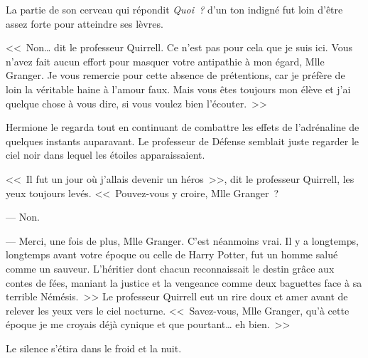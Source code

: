 La partie de son cerveau qui répondit \emph{Quoi~?} d'un ton indigné fut loin d'être assez forte pour atteindre ses lèvres.

<<~Non… dit le professeur Quirrell. Ce n'est pas pour cela que je suis ici. Vous n'avez fait aucun effort pour masquer votre antipathie à mon égard, Mlle Granger. Je vous remercie pour cette absence de prétentions, car je préfère de loin la véritable haine à l'amour faux. Mais vous êtes toujours mon élève et j'ai quelque chose à vous dire, si vous voulez bien l'écouter.~>>

Hermione le regarda tout en continuant de combattre les effets de l'adrénaline de quelques instants auparavant. Le professeur de Défense semblait juste regarder le ciel noir dans lequel les étoiles apparaissaient.

<<~Il fut un jour où j'allais devenir un héros~>>, dit le professeur Quirrell, les yeux toujours levés. <<~Pouvez-vous y croire, Mlle Granger~?

--- Non.

--- Merci, une fois de plus, Mlle Granger. C'est néanmoins vrai. Il y a longtemps, longtemps avant votre époque ou celle de Harry Potter, fut un homme salué comme un sauveur. L'héritier dont chacun reconnaissait le destin grâce aux contes de fées, maniant la justice et la vengeance comme deux baguettes face à sa terrible Némésis.~>> Le professeur Quirrell eut un rire doux et amer avant de relever les yeux vers le ciel nocturne. <<~Savez-vous, Mlle Granger, qu'à cette époque je me croyais déjà cynique et que pourtant… eh bien.~>>

Le silence s'étira dans le froid et la nuit.

